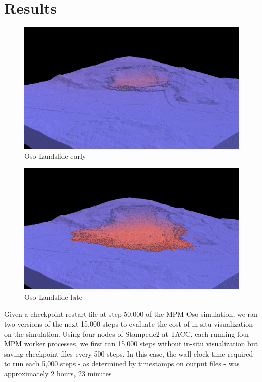 \documentclass[journal]{IEEEtran}
\begin{document}
\section{Results}
\begin{figure}[!tbp]
    \includegraphics[width=\linewidth]{figs/timestep-0000.png}
    \caption{Oso Landslide early}
    \label{fig:oso-early} 
\end{figure}
\vspace{0.2cm}
\begin{figure}[!tbp]
  \centering
    \includegraphics[width=\linewidth]{figs/timestep-0253.png}
    \caption{Oso Landslide late}
    \label{fig:oso-late}
\end{figure}

Given a checkpoint restart file at step 50,000 of the MPM Oso simulation, we ran two versions of the next 15,000 steps to evaluate the cost of in-situ visualization on the simulation.   Using four nodes of Stampede2 at TACC, each running four MPM worker processes, we first ran 15,000 steps without in-situ visualization but saving checkpoint files every 500 steps.  In this case, the wall-clock time required to run each 5,000 steps - as determined by timestamps on output files - was approximately 2 hours, 23 minutes.
\end{document}
